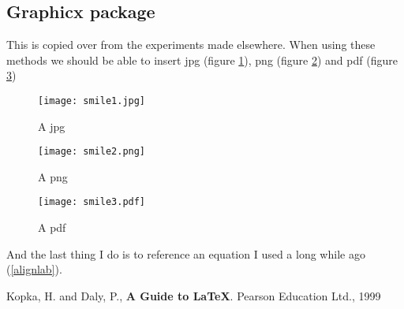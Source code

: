 \documentclass[12pt,a4paper]{article}
\renewcommand{\textit}{\textbf}
\newcommand{\nextalt}[1]{}
\theoremstyle{clearprint}
\begin{document}
\subsection[Graphicx]{Graphicx package}
\setcounter{equation}{0}

This is copied over from the experiments made elsewhere. When using these methods we should be able to insert jpg (figure \ref{jpg}), png (figure \ref{png}) and pdf (figure \ref{pdf})

\begin{figure}[!hp]
\noindent
\nextalt{This is an alt text for the following image $4$!}
\texttt{[image: smile1.jpg]}
\caption{A jpg}\label{jpg}
\end{figure}

\begin{figure}[!hp]
\nextalt{This is an alt text for the following png image $4$!}
\texttt{[image: smile2.png]}
\caption{A png}\label{png}
\end{figure}

\begin{figure}[!hp]
\nextalt{This is an alt text for the following pdf image $4$!}
\texttt{[image: smile3.pdf]}
\caption{A pdf}\label{pdf}
\end{figure}

And the last thing I do is to reference an equation I used a long while ago (\ref{alignlab}).

\clearpage

\begin{thebibliography}{99}
 Kopka, H. and Daly, P., \textit{A Guide to \LaTeX}. Pearson Education Ltd., 1999
\end{thebibliography}
\end{document}
